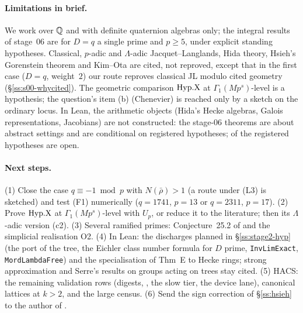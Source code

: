 \paragraph{Limitations in brief.} We work over $\mathbb{Q}$ and with definite quaternion algebras only; the integral results of
stage~06 are for $D=q$ a single prime and $p\ge5$, under explicit standing hypotheses. Classical, $p$-adic and $\Lambda$-adic
Jacquet--Langlands, Hida theory, Hsieh's Gorenstein theorem and Kim--Ota are cited, not reproved, except that in the first case
($D=q$, weight~$2$) our route reproves classical JL modulo cited geometry (\S\ref{ss:s00-whycited}). The geometric comparison
$\mathrm{Hyp.X}$ at $\Gamma_1(Mp^s)$-level is a hypothesis; the question's item (b) (Chenevier) is reached only by a sketch on the ordinary
locus. In Lean, the arithmetic objects (Hida's Hecke algebras, Galois representations, Jacobians) are not constructed: the
stage-06 theorems are about abstract settings and are conditional on registered hypotheses; \NumHypOpen{} of the
\NumHypRegistered{} registered hypotheses are open.

\paragraph{Next steps.} (1) Close the case $q\equiv-1\bmod p$ with $N(\bar\rho)>1$ (a route under (L3) is sketched) and test (F1)
numerically ($q=1741$, $p=13$ or $q=2311$, $p=17$). (2) Prove $\mathrm{Hyp.X}$ at $\Gamma_1(Mp^s)$-level with $U_p$, or reduce it to the
literature; then its $\Lambda$-adic version (c2). (3) Several ramified primes: Conjecture~25.2 of \mainpdf{} and the simplicial
realisation O2. (4) In Lean: the discharges planned in \S\ref{ss:stage2-hyp} (the port of the tree, the Eichler class number formula for $D$ prime, \texttt{InvLimExact}, \texttt{MordLambdaFree}) and the specialisation of Thm~E to Hecke rings; strong approximation and Serre's results on groups acting on trees stay cited. (5) HACS: the remaining validation rows (digests, , the slow tier, the device lane), canonical lattices at $k>2$, and the large census. (6) Send the sign correction of
\S\ref{ss:hsieh} to the author of \cite{Hs}.

